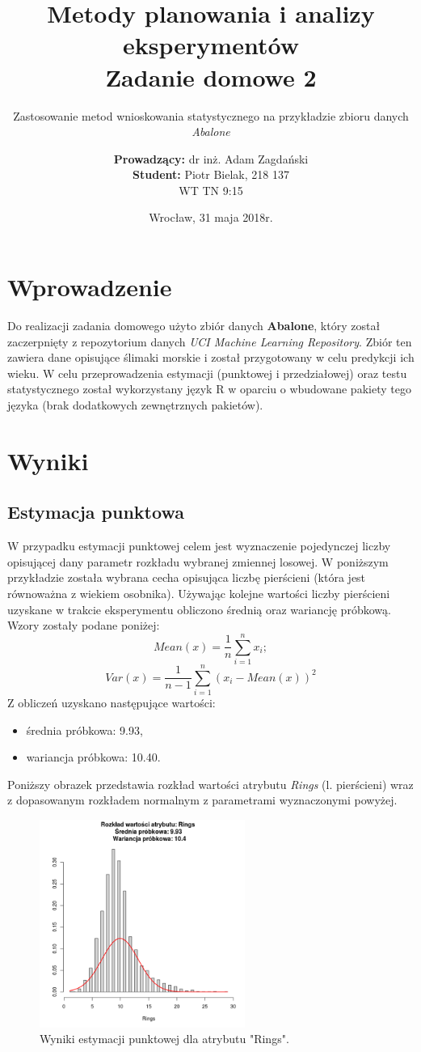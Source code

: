 \documentclass{scrartcl}
\title{Metody planowania i analizy eksperymentów\\Zadanie domowe 2}
\subtitle{Zastosowanie metod wnioskowania statystycznego na przykładzie zbioru danych \textit{Abalone}}
\author{\textbf{Prowadzący:} dr inż. Adam Zagdański \\ 
        \textbf{Student:} Piotr Bielak, 218 137\\WT TN 9:15}
\date{Wrocław, 31 maja 2018r.}
\begin{document}
\maketitle
\pagebreak
\section{Wprowadzenie}
Do realizacji zadania domowego użyto zbiór danych \textbf{Abalone}, który został
zaczerpnięty z repozytorium danych \textit{UCI Machine Learning Repository}. 
Zbiór ten zawiera dane opisujące ślimaki morskie i został przygotowany w celu 
predykcji ich wieku. W celu przeprowadzenia estymacji (punktowej i przedziałowej)
oraz testu statystycznego został wykorzystany język R w oparciu
o wbudowane pakiety tego języka (brak dodatkowych zewnętrznych pakietów).

\section{Wyniki}

\subsection{Estymacja punktowa}
W przypadku estymacji punktowej celem jest wyznaczenie pojedynczej liczby 
opisującej dany parametr rozkładu wybranej zmiennej losowej. W poniższym przykładzie
została wybrana cecha opisująca liczbę pierścieni (która jest równoważna z wiekiem
osobnika). Używając kolejne wartości liczby pierścieni uzyskane w trakcie eksperymentu
obliczono średnią oraz wariancję próbkową. Wzory zostały podane poniżej:
$$ Mean(x) = \frac{1}{n} \sum_{i = 1}^{n}x_i; $$
$$ Var(x) = \frac{1}{n - 1}\sum_{i = 1}^{n}(x_i - Mean(x))^2$$
Z obliczeń uzyskano następujące wartości:
\begin{itemize}
  \item{średnia próbkowa: 9.93,}
  \item{wariancja próbkowa: 10.40.}
\end{itemize}
Poniższy obrazek przedstawia rozkład wartości atrybutu \textit{Rings} (l. pierścieni) wraz
z dopasowanym rozkładem normalnym z parametrami wyznaczonymi powyżej.

\begin{figure}[H]
  \center
  \includegraphics[width=0.6\textwidth]{imgs/rings_estimated.png}
  \caption{Wyniki estymacji punktowej dla atrybutu "Rings".}
\end{figure}
\end{document}
